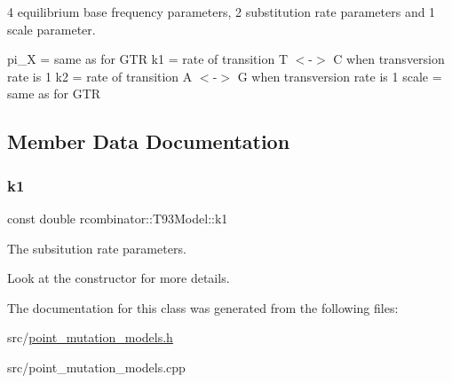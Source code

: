 4 equilibrium base frequency parameters, 2 substitution rate parameters and 1 scale parameter. 

pi\+\_\+X = same as for G\+TR k1 = rate of transition T $<$-\/$>$ C when transversion rate is 1 k2 = rate of transition A $<$-\/$>$ G when transversion rate is 1 scale = same as for G\+TR 

\subsection{Member Data Documentation}
\mbox{\label{classrcombinator_1_1T93Model_a98c3187ba2e9da1f608f17b1e3cf341b}} 
\subsubsection{\texorpdfstring{k1}{k1}}
{\footnotesize\ttfamily const double rcombinator\+::\+T93\+Model\+::k1\hspace{0.3cm}{\ttfamily [protected]}}



The subsitution rate parameters. 

Look at the constructor for more details. 

The documentation for this class was generated from the following files\+:\begin{DoxyCompactItemize}
\item 
src/\mbox{\hyperlink{point__mutation__models_8h}{point\+\_\+mutation\+\_\+models.\+h}}\item 
src/point\+\_\+mutation\+\_\+models.\+cpp\end{DoxyCompactItemize}
